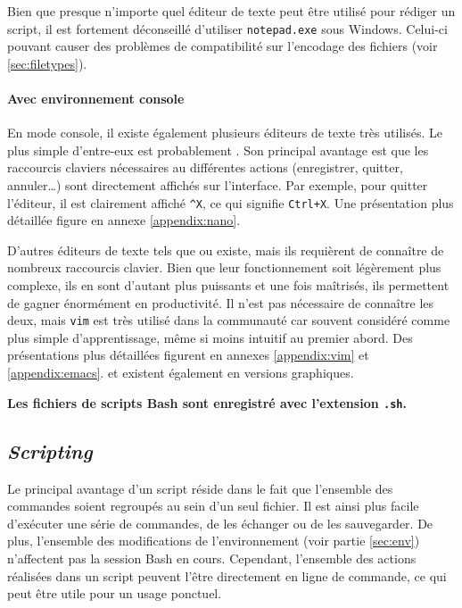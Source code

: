  Bien que presque n'importe quel éditeur de texte peut être utilisé pour rédiger un script, il est fortement déconseillé d'utiliser \texttt{notepad.exe} sous Windows. Celui-ci pouvant causer des problèmes de compatibilité sur l'encodage des fichiers (voir \ref{sec:filetypes}).

\paragraph{Avec environnement console}

En mode console, il existe également plusieurs éditeurs de texte très utilisés. Le plus simple d'entre-eux est probablement . Son principal avantage est que les raccourcis claviers nécessaires au différentes actions (enregistrer, quitter, annuler\dots) sont directement affichés sur l'interface. Par exemple, pour quitter l'éditeur, il est clairement affiché \texttt{\string^X}, ce qui signifie \texttt{Ctrl+X}. Une présentation plus détaillée figure en annexe \ref{appendix:nano}.

D'autres éditeurs de texte tels que  ou  existe, mais ils requièrent de connaître de nombreux raccourcis clavier. Bien que leur fonctionnement soit légèrement plus complexe, ils en sont d'autant plus puissants et une fois maîtrisés, ils permettent de gagner énormément en productivité. Il n'est pas nécessaire de connaître les deux, mais \texttt{vim} est très utilisé dans la communauté car souvent considéré comme plus simple d'apprentissage, même si moins intuitif au premier abord. Des présentations plus détaillées figurent en annexes \ref{appendix:vim} et \ref{appendix:emacs}.  et  existent également en versions graphiques.

\begin{nscenter}
    \textbf{Les fichiers de scripts Bash sont enregistré avec l'extension \texttt{.sh}.}
\end{nscenter}

\subsection{\textit{Scripting}}

Le principal avantage d'un script réside dans le fait que l'ensemble des commandes soient regroupés au sein d'un seul fichier. Il est ainsi plus facile d'exécuter une série de commandes, de les échanger ou de les sauvegarder. De plus, l'ensemble des modifications de l'environnement (voir partie \ref{sec:env}) n'affectent pas la session Bash en cours. Cependant, l'ensemble des actions réalisées dans un script peuvent l'être directement en ligne de commande, ce qui peut être utile pour un usage ponctuel.

